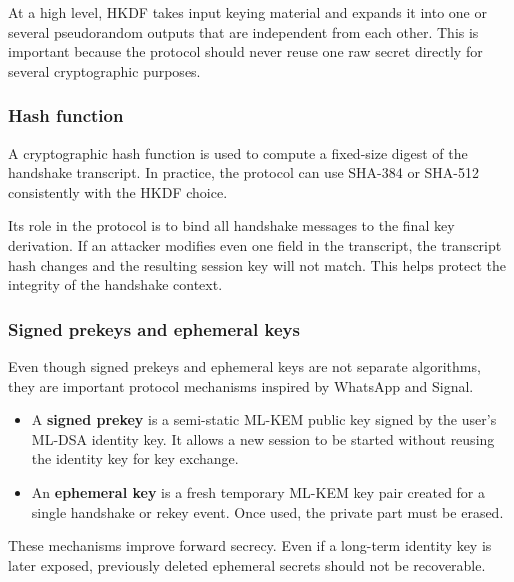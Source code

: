 \documentclass{article}
\begin{document}
      At a high level, HKDF takes input keying material and expands it into one
      or several pseudorandom outputs that are independent from each other. This
      is important because the protocol should never reuse one raw secret
      directly for several cryptographic purposes.

      \subsubsection{Hash function}
      A cryptographic hash function is used to compute a fixed-size digest of the
      handshake transcript. In practice, the protocol can use SHA-384 or SHA-512
      consistently with the HKDF choice.

      Its role in the protocol is to bind all handshake messages to the final key
      derivation. If an attacker modifies even one field in the transcript, the
      transcript hash changes and the resulting session key will not match. This
      helps protect the integrity of the handshake context.

      \subsubsection{Signed prekeys and ephemeral keys}
      Even though signed prekeys and ephemeral keys are not separate algorithms,
      they are important protocol mechanisms inspired by WhatsApp and Signal.

      \begin{itemize}
            \item A \textbf{signed prekey} is a semi-static ML-KEM public key
                  signed by the user's ML-DSA identity key. It allows a new
                  session to be started without reusing the identity key for key
                  exchange.
            \item An \textbf{ephemeral key} is a fresh temporary ML-KEM key pair
                  created for a single handshake or rekey event. Once used, the
                  private part must be erased.
      \end{itemize}

      These mechanisms improve forward secrecy. Even if a long-term identity key
      is later exposed, previously deleted ephemeral secrets should not be
      recoverable.
\end{document}
